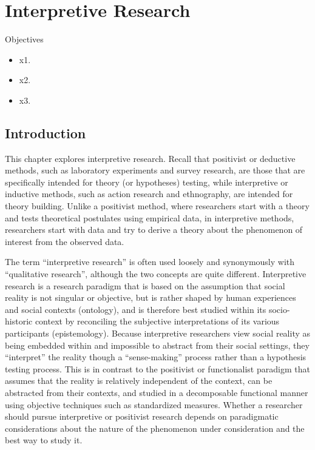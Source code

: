 \chapter{Interpretive Research}\label{ch13:interpretive_research}

\begin{center}
	\begin{objbox}{Objectives}
		\begin{itemize}
			\setlength{\itemsep}{0pt}
			\setlength{\parskip}{0pt}
			\setlength{\parsep}{0pt}
			
			\item x1.
			\item x2.
			\item x3.
		\end{itemize}
	\end{objbox}
\end{center}


\section{Introduction}

This chapter explores interpretive research. Recall that positivist or deductive methods, such as laboratory experiments and survey research, are those that are specifically intended for theory (or hypotheses) testing, while interpretive or inductive methods, such as action research and ethnography, are intended for theory building. Unlike a positivist method, where researchers start with a theory and tests theoretical postulates using empirical data, in interpretive methods, researchers start with data and try to derive a theory about the phenomenon of interest from the observed data.

The term ``interpretive research'' is often used loosely and synonymously with ``qualitative research'', although the two concepts are quite different. Interpretive research is a research paradigm that is based on the assumption that social reality is not singular or objective, but is rather shaped by human experiences and social contexts (ontology), and is therefore best studied within its socio-historic context by reconciling the subjective interpretations of its various participants (epistemology). Because interpretive researchers view social reality as being embedded within and impossible to abstract from their social settings, they ``interpret'' the reality though a ``sense-making'' process rather than a hypothesis testing process. This is in contrast to the positivist or functionalist paradigm that assumes that the reality is relatively independent of the context, can be abstracted from their contexts, and studied in a decomposable functional manner using objective techniques such as standardized measures. Whether a researcher should pursue interpretive or positivist research depends on paradigmatic considerations about the nature of the phenomenon under consideration and the best way to study it.

